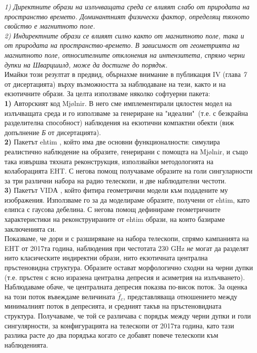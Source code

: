 \emph{1) Директните образи на излъчващата среда се влияят слабо от природата на пространство времето. Доминантният физически фактор, определящ тяхното свойство е магнитното поле.}\\

\emph{2) Индиректните образи се влияят силно както от магнитното поле, така и от природата на пространство-времето. В зависимост от геометрията на магнитното поле, относителните отклонения на интензитета, спрямо черни дупки на Шварцшилд, може да достигне до порядък.}\\

Имайки този резултат в предвид, обърнахме внимание в публикация IV (глава \emph{7} от дисертацията) върху възможността за наблюдаване на тези, както и на екзотичните образи. За целта използваме няколко софтуерни пакета:\\

\textbf{1)} Авторският код Mjølnir. В него сме имплементирали цялостен модел на излъчващата среда и го използваме за генериране на "идеални"$\,$ (т.е. с безкрайна разделителна способност) наблюдения на екзотични компактни обекти (виж допълнение \emph{Б} от дисертацията).\\

\textbf{2)} Пакетът ehtim \cite{EHTIM}, който има две основни функционалности: симулира реалистично наблюдение на образите, генерирани с помощта на Mjølnir, и също така извършва тяхната реконструкция, използвайки методологията на колаборацията EHT. С негова помощ получаваме образите на голи сингуларности за три различни набора на радио телескопи, и две наблюдателни честоти.\\

\textbf{3)} Пакетът VIDА \cite{VIDA}, който фитира геометрични модели към подадените му изображения. Използваме го за да моделираме образите, получени от ehtim, като елипса с гаусова дебелина. С негова помощ дефинираме геометричните характеристики на реконструираните от ehtim образи, на които базираме заключенията си.\\

Показваме, че дори и с разширяване на набора телескопи, спрямо кампанията на EHT от 2017та година, наблюдения при честотата $230$ GHz \emph{не} могат да разделят нито класическите индиректни образи, нито екзотичната централна пръстеновидна структура. Образите остават морфологично сходни на черни дупки (т.е. пръстен с ясно изразена централна депресия и асиметрия на излъчването). Наблюдаваме обаче, че централната депресия показва по-висок поток. За оценка на този поток въвеждаме величината $\hat{f}_c$, представляваща отношението между минималният поток в депресията, и средният такъв на пръстеновидната структура. Получаваме, че той се различава с порядък между черни дупки и голи сингулярности, за конфигурацията на телескопи от 2017та година, като тази разлика расте до два порядъка когато се добавят повече телескопи към наблюденията.\\

